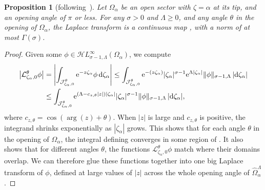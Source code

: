 \documentclass[10pt,a4paper]{amsart}
\let\Re\relax
\DeclareMathOperator{\Re}{Re}
\newcommand{\singexp}[2]{\mathcal{H}L^\infty_{#1, #2}}
\newcommand{\dualsingexp}[1]{\widehat{\mathcal{H}}L^\infty_{#1}}
\newcommand{\laplace}{\mathcal{L}}
\numberwithin{equation}{section}
\newtheorem{Proposition}[Theorem]{Proposition}
 { \theoremstyle{definition}
\newtheorem{Definition}[Theorem]{Definition}
\newtheorem{Remark}[Theorem]{Remark}
\newtheorem*{notation*}{Notation}
}
\begin{document}
\begin{Proposition}[following~\cite{sternin1995borel}]\label{prop:laplace-cont}
Let $\Omega_\alpha$ be an open sector with $\zeta = \alpha$ at its tip, and an opening angle of $\pi$ or less. For any $\sigma > 0$ and $\Lambda \ge 0$, and any angle $\theta$ in the opening of $\Omega_\alpha$, the Laplace transform \smash{$\laplace_{\zeta_\alpha, 0}^\theta$} is a continuous map \smash{$\singexp{\sigma-1}{\Lambda}(\Omega_\alpha) \to \dualsingexp{-\sigma}\bigl(\widehat{\Omega}_\alpha^\Lambda\bigr)$}, with a norm of at most $\Gamma(\sigma)$.
\end{Proposition}
\begin{proof}
Given some $\phi \in \singexp{\sigma-1}{\Lambda}(\Omega_\alpha)$, we compute
\begin{align*}
\big|\laplace_{\zeta_\alpha, 0}^\theta \phi\big| & = \left| \int_{\mathcal{J}_{\zeta_\alpha, 0}^\theta} {\rm e}^{-z\zeta_\alpha} \phi\, {\rm d}\zeta_\alpha \right| \le \int_{\mathcal{J}_{\zeta_\alpha,0}^\theta} {\rm e}^{-\Re(z\zeta_\alpha)} |\zeta_\alpha|^{\sigma-1} {\rm e}^{\Lambda |\zeta_\alpha|} \|\phi\|_{\sigma-1, \Lambda} \,|{\rm d}\zeta_\alpha| \\
& \le \int_{\mathcal{J}_{\zeta_\alpha,0}^\theta} {\rm e}^{(\Lambda - c_{z, \theta}|z|)|\zeta_\alpha|} |\zeta_\alpha|^{\sigma-1} \|\phi\|_{\sigma-1, \Lambda} \,|{\rm d}\zeta_\alpha|,
\end{align*}
where $c_{z, \theta} = \cos(\arg(z) + \theta)$. When $|z|$ is large and $c_{z, \theta}$ is positive, the integrand shrinks exponentially as $|\zeta_\alpha|$ grows. This shows that for each angle $\theta$ in the opening of $\Omega_\alpha$, the integral defining \smash{$\laplace_{\zeta_\alpha, 0}^\theta \phi$} converges in some region of \smash{$\widehat{\Omega}_\alpha^\Lambda$}. It also shows that for different angles $\theta$, the functions $\laplace_{\zeta_\alpha, 0}^\theta \phi$ match where their domains overlap. We can therefore glue these functions together into one big Laplace transform of $\phi$, defined at large values of $|z|$ across the whole opening angle of $\widehat{\Omega}_\alpha^\Lambda$.


\end{proof}
\end{document}
